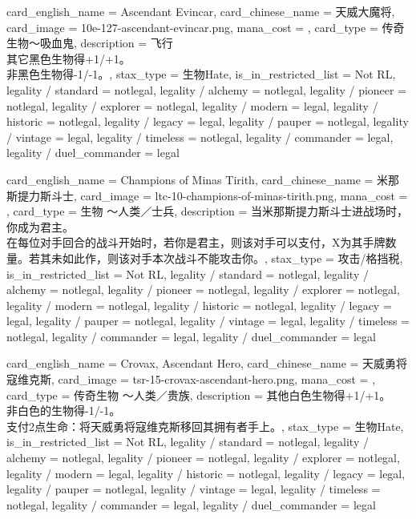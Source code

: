\documentclass[lang = cn, color = black, 10pt]{AllThatStax}
\begin{document}
\card
{
	card_english_name = {Ascendant Evincar},
	card_chinese_name = {天威大魔将},
	card_image = 10e-127-ascendant-evincar.png,
	mana_cost = ,
	card_type = 传奇生物～吸血鬼,
	description = {飞行\\
		其它黑色生物得+1/+1。\\
		非黑色生物得-1/-1。},
	stax_type = 生物Hate,
	is_in_restricted_list = Not RL,
	legality / standard = notlegal,
	legality / alchemy = notlegal,
	legality / pioneer = notlegal,
	legality / explorer = notlegal,
	legality / modern = legal,
	legality / historic = notlegal,
	legality / legacy = legal,
	legality / pauper = notlegal,
	legality / vintage = legal,
	legality / timeless = notlegal,
	legality / commander = legal,
	legality / duel_commander = legal
}

\card
{
	card_english_name = {Champions of Minas Tirith},
	card_chinese_name = {米那斯提力斯斗士},
	card_image = ltc-10-champions-of-minas-tirith.png,
	mana_cost = ,
	card_type = 生物 ～人类／士兵,
	description = {当米那斯提力斯斗士进战场时，你成为君主。\\
		在每位对手回合的战斗开始时，若你是君主，则该对手可以支付，X为其手牌数量。若其未如此作，则该对手本次战斗不能攻击你。},
	stax_type = 攻击/格挡税,
	is_in_restricted_list = Not RL,
	legality / standard = notlegal,
	legality / alchemy = notlegal,
	legality / pioneer = notlegal,
	legality / explorer = notlegal,
	legality / modern = notlegal,
	legality / historic = notlegal,
	legality / legacy = legal,
	legality / pauper = notlegal,
	legality / vintage = legal,
	legality / timeless = notlegal,
	legality / commander = legal,
	legality / duel_commander = legal
}

\card
{
	card_english_name = {Crovax, Ascendant Hero},
	card_chinese_name = {天威勇将寇维克斯},
	card_image = tsr-15-crovax-ascendant-hero.png,
	mana_cost = ,
	card_type = 传奇生物 ～人类／贵族,
	description = {其他白色生物得+1/+1。\\
		非白色的生物得-1/-1。\\
		支付2点生命：将天威勇将寇维克斯移回其拥有者手上。},
	stax_type = 生物Hate,
	is_in_restricted_list = Not RL,
	legality / standard = notlegal,
	legality / alchemy = notlegal,
	legality / pioneer = notlegal,
	legality / explorer = notlegal,
	legality / modern = legal,
	legality / historic = notlegal,
	legality / legacy = legal,
	legality / pauper = notlegal,
	legality / vintage = legal,
	legality / timeless = notlegal,
	legality / commander = legal,
	legality / duel_commander = legal
}
\end{document}
